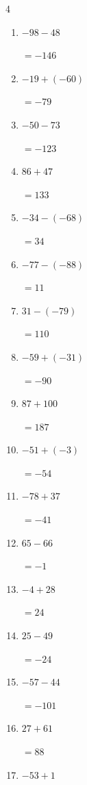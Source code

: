 \begin{multicols}{4}
\begin{enumerate}
        $=57$

  \item $-98-48$

        $=-146$

  \item $-19+(-60)$

        $=-79$

  \item $-50-73$

        $=-123$

  \item $86+47$

        $=133$

  \item $-34-(-68)$

        $=34$

\columnbreak %

  \item $-77-(-88)$

        $=11$

  \item $31-(-79)$

        $=110$

  \item $-59+(-31)$

        $=-90$

  \item $87+100$

        $=187$

  \item $-51+(-3)$

        $=-54$

  \item $-78+37$

        $=-41$

  \item $65-66$

        $=-1$

  \item $-4+28$

        $=24$

  \item $25-49$

        $=-24$

  \item $-57-44$

        $=-101$

  \item $27+61$

        $=88$

  \item $-53+1$


\end{enumerate}
\end{multicols}
